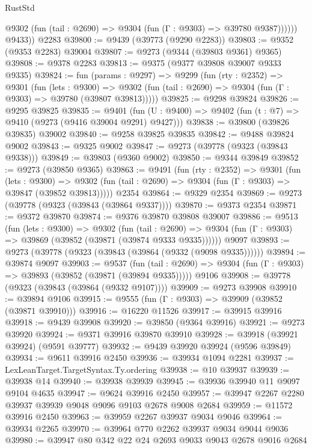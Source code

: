 \begin{lexlean}{RustStd}
\begin{coremodule}
{\begin{coremodule}
{{{{{{{{{{{{{{{{{{{{{{{{{{{{{{{{{{{{{{{{{{{{{{{{{{{{{{{              @9302 (fun (tail : @2690) => @9304 (fun (Γ : @9303) => @39780 @9387))))))
        @9433))
    @2283
@39800 := @9439 (@39773 (@9290 @2283))
@39803 := @9352 (@9353 @2283) @39004
@39807 := @9273 (@9344 (@39803 @9361) @9365)
@39808 := @9378 @2283
@39813 := @9375 (@9377 @39808 @39007 @9333 @9335)
@39824 := fun (params : @9297) =>
  @9299
    (fun (rty : @2352) =>
    @9301
      (fun (lets : @9300) =>
      @9302 (fun (tail : @2690) => @9304 (fun (Γ : @9303) => @39780 (@39807 @39813)))))
@39825 := @9298 @39824
@39826 := @9295 @39825
@39835 := @9401
    (fun (U : @9400) => @9402 (fun (t : @7) => @9410 (@9273 (@9416 @39004 @9291) @9427)))
@39838 := @39800 (@39826 @39835) @39002
@39840 := @9258 @39825 @39835
@39842 := @9488 @39824 @9002
@39843 := @9325 @9002
@39847 := @9273 (@39778 (@9323 (@39843 @9338)))
@39849 := @39803 (@9360 @9002)
@39850 := @9344 @39849
@39852 := @9273 (@39850 @9365)
@39863 := @9491
    (fun (rty : @2352) =>
    @9301
      (fun (lets : @9300) =>
      @9302 (fun (tail : @2690) => @9304 (fun (Γ : @9303) => @39847 (@39852 @39813)))))
    @2354
@39864 := @9329 @2354
@39869 := @9273 (@39778 (@9323 (@39843 (@39864 @9337))))
@39870 := @9373 @2354
@39871 := @9372 @39870
@39874 := @9376 @39870 @39808 @39007
@39886 := @9513
    (fun (lets : @9300) =>
    @9302
      (fun (tail : @2690) =>
      @9304 (fun (Γ : @9303) => @39869 (@39852 (@39871 (@39874 @9333 @9335))))))
    @9097
@39893 := @9273 (@39778 (@9323 (@39843 (@39864 (@9332 (@9098 @9335))))))
@39894 := @39874 @9097
@39903 := @9537
    (fun (tail : @2690) => @9304 (fun (Γ : @9303) => @39893 (@39852 (@39871 (@39894 @9335)))))
    @9106
@39908 := @39778 (@9323 (@39843 (@39864 (@9332 @9107))))
@39909 := @9273 @39908
@39910 := @39894 @9106
@39915 := @9555 (fun (Γ : @9303) => @39909 (@39852 (@39871 @39910)))
@39916 := @16220 @11526
@39917 := @39915 @39916
@39918 := @9439 @39908
@39920 := @39850 (@9364 @39916)
@39921 := @9273 @39920
@39924 := @9371 @39916 @39870 @39910
@39928 := @39918 (@39921 @39924) (@9591 @39777)
@39932 := @9439 @39920 @39924 (@9596 @39849)
@39934 := @9611 @39916 @2450
@39936 := @39934 @1094 @2281
@39937 := LexLeanTarget.TargetSyntax.Ty.ordering
@39938 := @10 @39937
@39939 := @39938 @14
@39940 := @39938 @39939
@39945 := @39936 @39940 @11 @9097 @9104 @4635
@39947 := @9624 @39916 @2450
@39957 := @39947 @2267 @2280 @39937 @39939 @9048 @9096 @9103 @2678 @9008 @2684
@39959 := @11572 @39916 @2450
@39963 := @39959 @2267 @39937 @9034 @9046
@39964 := @39934 @2265
@39970 := @39964 @770 @2262 @39937 @9034 @9044 @9036
@39980 := @39947 @80 @342 @22 @24 @2693 @9033 @9043 @2678 @9016 @2684
}}}}}}}}}}}}}}}}}}}}}}}}}}}}}}}}}}}}}}}}}}}}}}}}}}}}}}}
\end{coremodule}}
\end{coremodule}
\end{lexlean}
